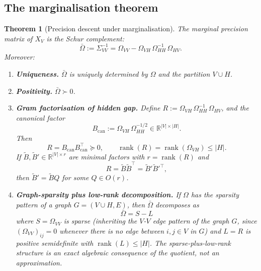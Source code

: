 \documentclass[11pt,a4paper]{article}
\numberwithin{equation}{section}
\DeclareMathOperator{\rank}{rank}
\newcommand{\R}{\mathbb{R}}
\theoremstyle{thmcompact}
\newtheorem{theorem}{Theorem}[section]
\theoremstyle{remark}
\begin{document}
\subsection{The marginalisation theorem}

\begin{theorem}[Precision descent under marginalisation]\label{thm:bridge-D}
The marginal precision matrix of $X_V$ is the Schur complement:
\begin{equation}\label{eq:D-schur}
\bar{\Omega} := \Sigma_{VV}^{-1} = \Omega_{VV} - \Omega_{VH}\,\Omega_{HH}^{-1}\,\Omega_{HV}.
\end{equation}
Moreover:
\begin{enumerate}[label=\textup{(\roman*)}]
\item \textbf{Uniqueness.} $\bar{\Omega}$ is uniquely determined by $\Omega$ and the partition $V \cup H$.
\item \textbf{Positivity.} $\bar{\Omega} \succ 0$.
\item \textbf{Gram factorisation of hidden gap.} Define $R := \Omega_{VH}\,\Omega_{HH}^{-1}\,\Omega_{HV}$, and the canonical factor
\[
B_{\mathrm{can}} := \Omega_{VH}\,\Omega_{HH}^{-1/2} \in \R^{|V| \times |H|}.
\]
Then
\begin{equation}\label{eq:D-gram}
R = B_{\mathrm{can}} B_{\mathrm{can}}^\top \succeq 0, \qquad \rank(R) = \rank(\Omega_{VH}) \leq |H|.
\end{equation}
If $\widetilde B, \widetilde B' \in \R^{|V| \times r}$ are \emph{minimal factors} with $r = \rank(R)$ and
\[
R = \widetilde B\widetilde B^\top = \widetilde B'\widetilde B'^\top,
\]
then $\widetilde B' = \widetilde BQ$ for some $Q \in O(r)$.
\item \textbf{Graph-sparsity plus low-rank decomposition.} If $\Omega$ has the sparsity pattern of a graph $G = (V \cup H, E)$, then $\bar{\Omega}$ decomposes as
\begin{equation}\label{eq:D-sparse-lowrank}
\bar{\Omega} = S - L
\end{equation}
where $S = \Omega_{VV}$ is sparse (inheriting the $V$-$V$ edge pattern of the graph $G$, since $(\Omega_{VV})_{ij} = 0$ whenever there is no edge between $i, j \in V$ in $G$) and $L = R$ is positive semidefinite with $\rank(L) \leq |H|$. The sparse-plus-low-rank structure is an exact algebraic consequence of the quotient, not an approximation.
\end{enumerate}
\end{theorem}
\end{document}

